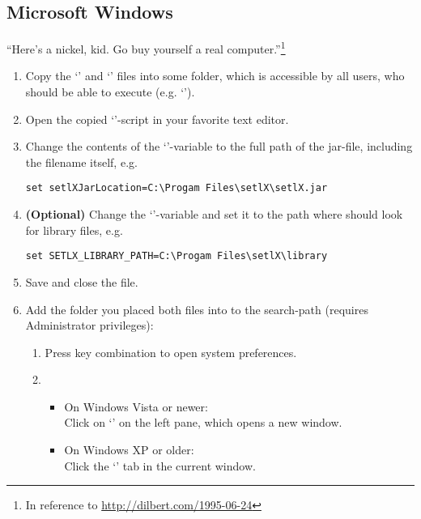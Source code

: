 \subsection{Microsoft Windows}

\begin{center}
\large
``Here's a nickel, kid. Go buy yourself a real computer.''\footnote{In reference to \url{http://dilbert.com/1995-06-24}}
\end{center}

\begin{enumerate}
	\item Copy the `' and `' files into some folder, which is accessible by all users, who should be able to execute \setlX{} (e.g. `').
	\item Open the copied `'-script in your favorite text editor.
	\item Change the contents of the `'-variable to the full path of the jar-file, including the filename itself, e.g.
\begin{lstlisting}[frame=none,numbers=none]
set setlXJarLocation=C:\Progam Files\setlX\setlX.jar
\end{lstlisting}
	\item \textbf{(Optional)} Change the `'-variable and set it to the path where \setlX{} should look for library files, e.g.
\begin{lstlisting}[frame=none,numbers=none]
set SETLX_LIBRARY_PATH=C:\Progam Files\setlX\library
\end{lstlisting}
	\item Save and close the file.
	\item Add the folder you placed both files into to the search-path (requires Administrator privileges):
	\begin{enumerate}
		\item Press \command{[Win]+[Pause]} key combination to open system preferences.
		\item 
		\begin{itemize}
			\item On Windows Vista or newer:\\Click on `' on the left pane, which opens a new window.
			\item On Windows XP or older:\\Click the `' tab in the current window.

\end{itemize}
\end{enumerate}
\end{enumerate}

